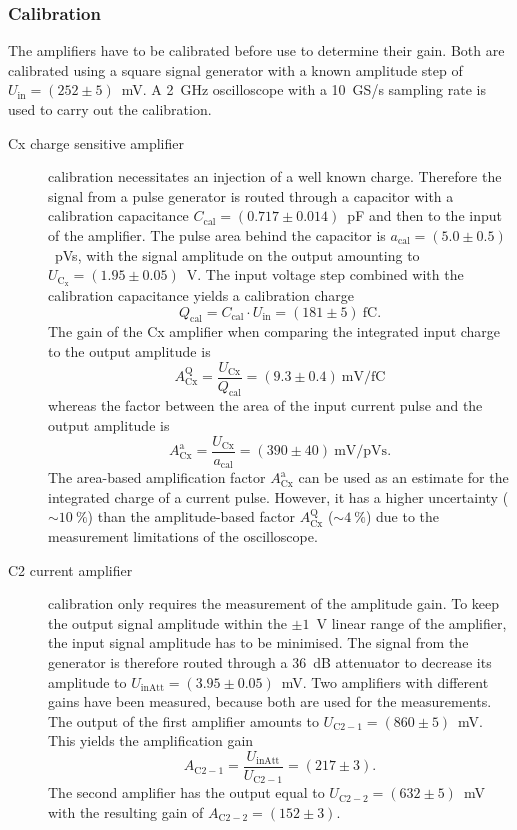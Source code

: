 \subsubsection{Calibration}
The amplifiers have to be calibrated before use to determine their gain. Both are calibrated using a square signal generator with a known amplitude step of $U_{\mathrm{in}}=(252\pm5)$~mV. A 2~GHz oscilloscope with a 10~GS/s sampling rate is used to carry out the calibration. 

\begin{description}
\item[Cx charge sensitive amplifier] calibration necessitates an injection of a well known charge. Therefore the signal from a pulse generator is routed through a capacitor with a calibration capacitance $C_{\mathrm{cal}}=(0.717\pm0.014)$~pF and then to the input of the amplifier. The pulse area behind the capacitor is $a_{\mathrm{cal}}=(5.0\pm0.5)$~pVs, with the signal amplitude on the output amounting to $U_{\mathrm{C_x}}=(1.95\pm0.05)$~V. The input voltage step combined with the calibration capacitance yields a calibration charge
\begin{equation}
Q_{\mathrm{cal}}=C_{\mathrm{cal}}\cdot U_{\mathrm{in}}=(181\pm5)~\mathrm{fC}.
\end{equation}
The gain of the Cx amplifier when comparing the integrated input charge to the output amplitude is 
\begin{equation}
A^{\mathrm{Q}}_{\mathrm{Cx}}=\frac{U_{\mathrm{Cx}}}{Q_{\mathrm{cal}} }=(9.3\pm0.4)~\mathrm{mV/fC}
\end{equation}
whereas the factor between the area of the input current pulse and the output amplitude is 
\begin{equation}
A^{\mathrm{a}}_{\mathrm{Cx}}=\frac{U_{\mathrm{Cx}}}{a_{\mathrm{cal}} }=(390\pm40)~\mathrm{mV/pVs}. 
\end{equation}
The area-based amplification factor $A^{\mathrm{a}}_{\mathrm{Cx}}$ can be used as an estimate for the integrated charge of a current pulse. However, it has a higher uncertainty ($\sim10~\%$) than the amplitude-based factor $A^{\mathrm{Q}}_{\mathrm{Cx}}$ ($\sim4~\%$) due to the measurement limitations of the oscilloscope.

\item[C2 current amplifier] calibration only requires the measurement of the amplitude gain. To keep the output signal amplitude within the $\pm1$~V linear range of the amplifier, the input signal amplitude has to be minimised. The signal from the generator is therefore routed through a 36~dB attenuator to decrease its amplitude to $U_{\mathrm{inAtt}}=(3.95\pm0.05)$~mV. Two amplifiers with different gains have been measured, because both are used for the measurements. The output of the first amplifier amounts to $U_{\mathrm{C2-1}}=(860\pm5)$~mV. This yields the amplification gain 
\begin{equation}
A_{\mathrm{C2-1}}=\frac{U_{\mathrm{inAtt}}}{U_{\mathrm{C2-1}}} =(217\pm3). 
\end{equation}
The second amplifier has the output equal to $U_{\mathrm{C2-2}}=(632\pm5)$~mV with the resulting gain of $A_{\mathrm{C2-2}}=(152\pm3)$. 
\end{description}


